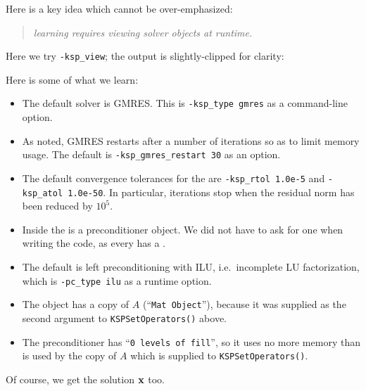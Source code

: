 Here is a key idea which cannot be over-emphasized:
\begin{quote}
\emph{learning \PETSc requires viewing \emph{solver} objects at runtime.}
\end{quote}
Here we try \texttt{-ksp\_view}; the output is slightly-clipped for clarity:
Here is some of what we learn:
\begin{itemize}
\item The default \pKSP solver is GMRES.  This is \texttt{-ksp\_type gmres} as a command-line option.
\item As noted, GMRES restarts after a number of iterations so as to limit memory usage.  The default is \texttt{-ksp\_gmres\_restart 30} as an option.
\item The default convergence tolerances for the \pKSP are \texttt{-ksp\_rtol 1.0e-5} and \texttt{-ksp\_atol 1.0e-50}.  In particular, \pKSP iterations stop when the residual norm has been reduced by $10^5$.
\item Inside the \pKSP is a \pPC preconditioner object.  We did not have to ask for one when writing the code, as every \pKSP has a \pPC.
\item The default \pPC is left preconditioning with ILU, i.e.~incomplete LU factorization, which is \texttt{-pc\_type ilu} as a runtime option.
\item The \pPC object has a copy of $A$ (``\texttt{Mat Object}''), because it was supplied as the second argument to \texttt{KSPSetOperators()} above.
\item The preconditioner has ``\texttt{0 levels of fill}'', so it uses no more memory than is used by the copy of $A$ which is supplied to \texttt{KSPSetOperators()}.
\end{itemize}
Of course, we get the solution $\mathbf{x}$ too.

